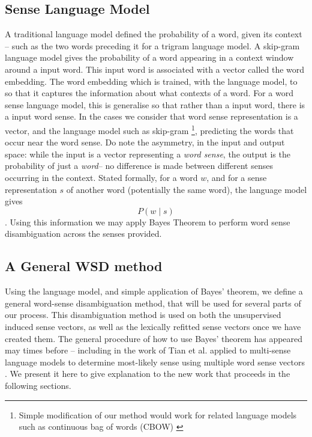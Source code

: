 \documentclass{sig-alternate}
\begin{document}
\subsection{Sense Language Model} \label{senselanguagemodel}
A traditional language model defined the probability of a word, given its context -- such as the two words preceding it for a trigram language model.
A skip-gram language model gives the probability of a word appearing in a context window around a input word.
This input word is associated with a vector called the word embedding. The word embedding which is trained, with the language model, to so that it captures the information about what contexts of a word.  For a word sense language model, this is generalise so that rather than a input word, there is a input word sense.
In the cases we consider that word sense representation is a vector, and the language model such as skip-gram\parencite{mikolov2013efficient} \footnote{Simple modification of our method would work for related language models such as continuous bag of words (CBOW) \parencite{mikolov2013efficient}}, predicting the words that occur near the word sense. Do note the asymmetry, in the input and output space: while the input is a vector representing a \emph{word sense}, the output is the probability of just a \emph{word}-- no difference is made between different senses occurring in the context. Stated formally, for a word $w$, and for a sense representation $s$ of another word (potentially the same word), the language model gives $$P(w \mid s)$$. Using this information we may apply Bayes Theorem to perform word sense disambiguation across the senses provided.

\subsection{A General WSD method} \label{generalwsd}
Using the language model, and simple application of Bayes' theorem, we define a general word-sense disambiguation method, that will be used for several parts of our process. This disambiguation method is used on both the unsupervised induced sense vectors, as well as the lexically refitted sense vectors once we have created them.
The general procedure of how to use Bayes' theorem has appeared may times before -- including in the work of Tian et al. applied to multi-sense language models to determine most-likely sense using multiple word sense vectors \parencite{tian2014probabilistic}. We present it here to give explanation to the new work that proceeds in the following sections.
\end{document}
